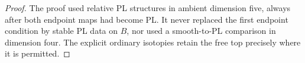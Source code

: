 \begin{proof}
The proof used relative PL structures in ambient dimension five,
always after both endpoint maps had become PL. It never replaced
the first endpoint condition by stable PL data on $B$, nor used a
smooth-to-PL comparison in dimension four. The explicit ordinary
isotopies retain the free top precisely where it is permitted.
\end{proof}
